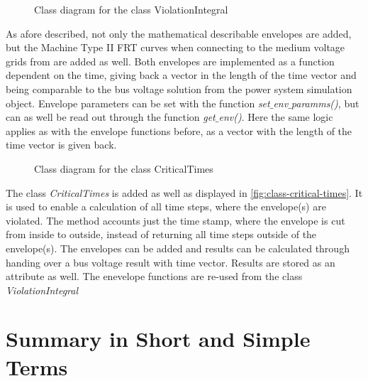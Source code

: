 \begin{figure}[htbp!]
        \centering
        \caption[Class diagram for the class ViolationIntegral]{Class diagram for the class ViolationIntegral}
        \label{fig:class-violation-integral}
\end{figure}

As afore described, not only the mathematical describable envelopes are added, but the Machine Type II \acs{FRT} curves when connecting to the medium voltage grids from \autocite{vde-tar_2018,vde-tar_2023} are added as well.
Both envelopes are implemented as a function dependent on the time, giving back a vector in the length of the time vector and being comparable to the bus voltage solution from the power system simulation object.
Envelope parameters can be set with the function \textit{set$\_$env$\_$paramms()}, but can as well be read out through the function \textit{get$\_$env()}.
Here the same logic applies as with the envelope functions before, as a vector with the length of the time vector is given back.

\begin{figure}[htbp!]
        \centering
        \caption[Class diagram for the class CriticalTimes]{Class diagram for the class CriticalTimes}
        \label{fig:class-critical-times}
\end{figure}

The class \textit{CriticalTimes} is added as well as displayed in \autoref{fig:class-critical-times}.
It is used to enable a calculation of all time steps, where the envelope(s) are violated.
The method accounts just the time stamp, where the envelope is cut from inside to outside, instead of returning all time steps outside of the envelope(s).
The envelopes can be added and results can be calculated through handing over a bus voltage result with time vector.
Results are stored as an attribute as well.
The enevelope functions are re-used from the class \textit{ViolationIntegral}

\section{Summary in Short and Simple Terms}

